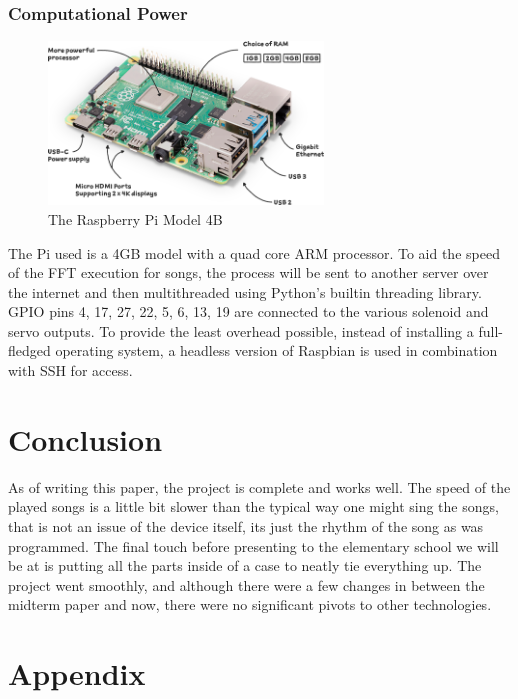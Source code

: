 \documentclass[UTF8, 12pt]{article}
\begin{document}
    \subsubsection{Computational Power}
    \begin{figure}[h]
        \centering
        \includegraphics[width=0.65\textwidth]{rpi.png}
        \caption{The Raspberry Pi Model 4B}
    \end{figure}
    The Pi used is a 4GB model with a quad core ARM processor. To aid the speed of the FFT execution for songs, the process will be sent to another server over the internet and then multithreaded using Python's builtin threading library. GPIO pins 4, 17, 27, 22, 5, 6, 13, 19 are connected to the various solenoid and servo outputs. To provide the least overhead possible, instead of installing a full-fledged operating system, a headless version of Raspbian is used in combination with SSH for access.
\section{Conclusion}
    As of writing this paper, the project is complete and works well. The speed of the played songs is a little bit slower than the typical way one might sing the songs, that is not an issue of the device itself, its just the rhythm of the song as was programmed. The final touch before presenting to the elementary school we will be at is putting all the parts inside of a case to neatly tie everything up. The project went smoothly, and although there were a few changes in between the midterm paper and now, there were no significant pivots to other technologies. 

\section{Appendix}
\end{document}
